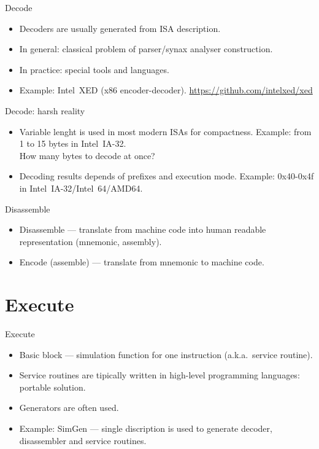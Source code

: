 \begin{frame}{Decode}
\begin{itemize}
\item Decoders are usually generated from ISA description.
\item In general: classical problem of parser/synax analyser construction.
\item In practice: special tools and languages.
\item Example: Intel\reg~XED (x86 encoder-decoder). \url{https://github.com/intelxed/xed}
\end{itemize}
\end{frame}

\begin{frame}{Decode: harsh reality}
  \begin{itemize}
    \item Variable lenght is used in most modern ISAs for compactness.
      Example: from 1 to 15 bytes in Intel\reg~IA-32. \\
      How many bytes to decode at once?
    \item Decoding results depends of prefixes and execution mode.
      Example: 0x40-0x4f in Intel\reg~IA-32/Intel\reg~64/AMD64.
  \end{itemize}
\end{frame}

\begin{frame}{Disassemble}
\begin{itemize}
\item Disassemble --- translate from machine code into human readable
  representation (mnemonic, assembly).
\item Encode (assemble) --- translate from mnemonic to machine code.
\end{itemize}
\end{frame}

\section{Execute}

\begin{frame}{Execute}
\begin{itemize}
\item Basic block --- simulation function for one instruction (a.k.a.~service routine).
\item Service routines are tipically written in high-level programming
  languages: portable solution.
\item Generators are often used.
\item Example: SimGen --- single discription is used to generate decoder,
  disassembler and service routines.
\end{itemize}
\end{frame}


